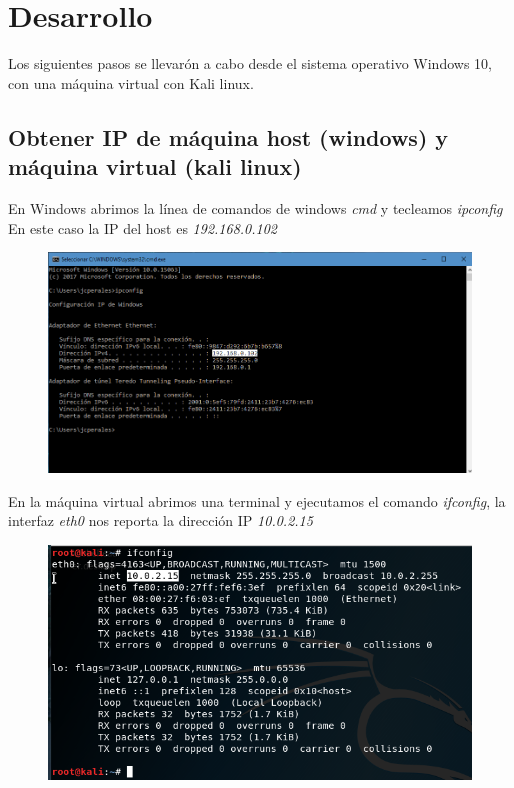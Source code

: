 \documentclass{article}
\begin{document}
\section{Desarrollo}Los siguientes pasos se llevarón a cabo desde el sistema operativo Windows 10, con una m\'aquina virtual con Kali linux.

\subsection{Obtener IP de m\'aquina host (windows) y m\'aquina virtual (kali linux)}
En Windows abrimos la l\'inea de comandos de windows \emph{cmd} y tecleamos \emph{ipconfig}
En este caso la IP del host es \emph{192.168.0.102}

\begin{figure}[H]
\centering
\includegraphics[width=1\textwidth]{01-IPCONFIG}
\end{figure}

En la m\'aquina virtual abrimos una terminal y ejecutamos el comando \emph{ifconfig}, la interfaz \emph{eth0} nos reporta la direcci\'on IP \emph{10.0.2.15}

\begin{figure}[H]
\centering
\includegraphics[width=1\textwidth]{02-IFCONFIG}
\end{figure}
\end{document}
